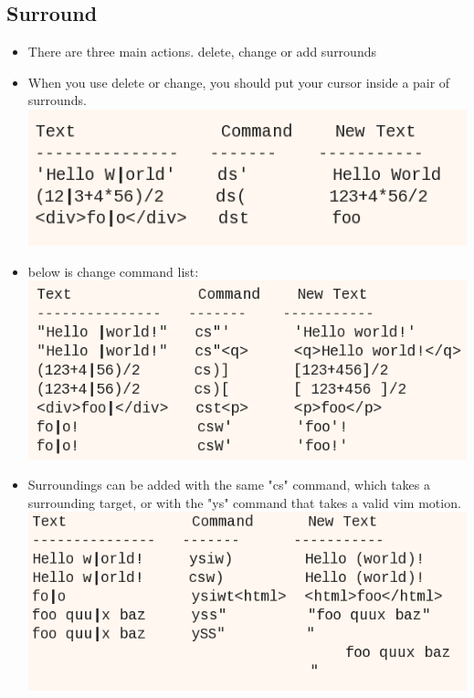 \documentclass[a4paper,12pt,twoside]{book}
\begin{document}
\subsection{Surround}
\begin{itemize}
		\item There are three main actions. delete, change or add surrounds
		\item When you use delete or change, you should put your cursor inside a pair of surrounds.
		\includegraphics[scale=0.4]{pics/surround1.png} \\
	\item below is change command list:
	\includegraphics[scale=0.4]{pics/surround2.png} \\
		
		\item Surroundings can be added with the same "cs" command, which takes a surrounding target, or with the "ys" command that takes a valid vim motion. 
	\includegraphics[scale=0.4]{pics/surround3.png} \\
	   

\end{itemize}
\end{document}
